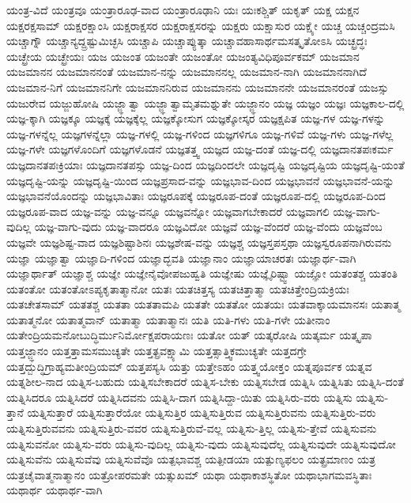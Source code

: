 {ಯಂತ್ರ-ವಿದೆ
ಯಂತ್ರವೂ
ಯಂತ್ರಾರೂಢ-ವಾದ
ಯಂತ್ರಾರೂಢಾನಿ
ಯಃ
ಯಃಕಶ್ಚಿತ್
ಯಕೃತ್
ಯಕ್ಷ
ಯಕ್ಷನ
ಯಕ್ಷರಕ್ಷಸಾಮ್
ಯಕ್ಷರಕ್ಷಾಂಸಿ
ಯಕ್ಷರಾಕ್ಷಸರ
ಯಕ್ಷರಾಕ್ಷಸರನ್ನು
ಯಕ್ಷರು
ಯಕ್ಷಾಸುರ
ಯಕ್ಷ್ಯೇ
ಯಚ್ಚ
ಯಚ್ಚಂದ್ರಮಸಿ
ಯಚ್ಚಾಗ್ನೌ
ಯಚ್ಚಾನ್ಯದ್ದ್ರಷ್ಟುಮಿಚ್ಛಸಿ
ಯಚ್ಚಾಪಿ
ಯಚ್ಚಾಪ್ಯುತ್ಕಾ
ಯಚ್ಚಾವಹಾಸಾರ್ಥಮಸತ್ಕೃತೋಽಸಿ
ಯಚ್ಛ್ರದ್ಧಃ
ಯಚ್ಛ್ರೇಯ
ಯಚ್ಛ್ರೇಯಃ
ಯಜ
ಯಜಂತ
ಯಜಂತೇ
ಯಜಂತೋ
ಯಜಂತ್ಯವಿಧಿಪೂರ್ವಕಮ್
ಯಜಮಾನ
ಯಜಮಾನನ
ಯಜಮಾನನಂತೆ
ಯಜಮಾನ-ನನ್ನು
ಯಜಮಾನನಲ್ಲ
ಯಜಮಾನ-ನಾಗಿ
ಯಜಮಾನನಾಗಿದೆ
ಯಜಮಾನ-ನಿಗೆ
ಯಜಮಾನನಿಗೇ
ಯಜಮಾನನಿರುವ
ಯಜಮಾನನು
ಯಜಮಾನನೇ
ಯಜಮಾನರಂತೆ
ಯಜಸ್ಸು
ಯಜುರೇವ
ಯಜ್ಜುಹೋಷಿ
ಯಜ್ಜ್ಞಾತ್ವಾ
ಯಜ್ಜ್ಞಾತ್ವಾಮೃತಮಶ್ನುತೇ
ಯಜ್ಜ್ಞಾನಂ
ಯಜ್ಞ
ಯಜ್ಞಂ
ಯಜ್ಞಃ
ಯಜ್ಞಕಾಲ-ದಲ್ಲಿ
ಯಜ್ಞ-ಕ್ಕಾಗಿ
ಯಜ್ಞಕ್ಕೂ
ಯಜ್ಞಕ್ಕೆ
ಯಜ್ಞಕ್ಕೆಲ್ಲ
ಯಜ್ಞಕ್ಕೋಸುಗ
ಯಜ್ಞಕ್ಕೋಸ್ಕರ
ಯಜ್ಞಕ್ಷಪಿತ
ಯಜ್ಞ-ಗಳ
ಯಜ್ಞ-ಗಳನ್ನು
ಯಜ್ಞ-ಗಳನ್ನೆಲ್ಲ
ಯಜ್ಞಗಳನ್ನೆಲ್ಲಾ
ಯಜ್ಞ-ಗಳಲ್ಲಿ
ಯಜ್ಞ-ಗಳಿಂದ
ಯಜ್ಞಗಳಿಗೂ
ಯಜ್ಞ-ಗಳಿವೆ
ಯಜ್ಞ-ಗಳು
ಯಜ್ಞ-ಗಳೆಲ್ಲ
ಯಜ್ಞ-ಗಳೇ
ಯಜ್ಞಗಳೊಂದಿಗೆ
ಯಜ್ಞಗಳೊಡನೆ
ಯಜ್ಞತತ್ತ್ವ
ಯಜ್ಞದ
ಯಜ್ಞ-ದಂತೆ
ಯಜ್ಞ-ದಲ್ಲಿ
ಯಜ್ಞದಾನತಪಃಕರ್ಮ
ಯಜ್ಞದಾನತಪಃಕ್ರಿಯಾಃ
ಯಜ್ಞದಾನತಪಸ್ಸು
ಯಜ್ಞ-ದಿಂದ
ಯಜ್ಞದಿಂದಲೇ
ಯಜ್ಞದೃಷ್ಟಿ
ಯಜ್ಞದೃಷ್ಟಿಯ
ಯಜ್ಞದೃಷ್ಟಿ-ಯಂತೆ
ಯಜ್ಞದೃಷ್ಟಿ-ಯನ್ನು
ಯಜ್ಞದೃಷ್ಟಿ-ಯಿಂದ
ಯಜ್ಞಪ್ರಸಾದ-ವನ್ನು
ಯಜ್ಞಭಾವ-ದಿಂದ
ಯಜ್ಞಭಾವನೆ
ಯಜ್ಞಭಾವನೆ-ಯನ್ನು
ಯಜ್ಞಭಾವನೆಯೊಂದನ್ನು
ಯಜ್ಞಭಾವಿತಾಃ
ಯಜ್ಞರೂಪಕ್ಕೆ
ಯಜ್ಞರೂಪ-ದಂತೆ
ಯಜ್ಞರೂಪ-ದಲ್ಲಿ
ಯಜ್ಞರೂಪ-ದಿಂದ
ಯಜ್ಞರೂಪ-ವಾದ
ಯಜ್ಞ-ವನ್ನು
ಯಜ್ಞ-ವನ್ನೂ
ಯಜ್ಞವನ್ನೋ
ಯಜ್ಞವಾಗಬೇಕಾದರೆ
ಯಜ್ಞವಾಗಲಿ
ಯಜ್ಞ-ವಾಗು-ವುದಿಲ್ಲ
ಯಜ್ಞ-ವಾಗು-ವುದು
ಯಜ್ಞ-ವಾದರೂ
ಯಜ್ಞವಿದೋ
ಯಜ್ಞವೆ
ಯಜ್ಞ-ವೆಂದರೆ
ಯಜ್ಞ-ವೆಂದು
ಯಜ್ಞವೆಂಬ
ಯಜ್ಞವೇ
ಯಜ್ಞಶಿಷ್ಟ-ವಾದ
ಯಜ್ಞಶಿಷ್ಟಾಶಿನಃ
ಯಜ್ಞಶೇಷ-ವನ್ನು
ಯಜ್ಞಶ್ಚ
ಯಜ್ಞಸ್ತಪಸ್ತಥಾ
ಯಜ್ಞಸ್ವರೂಪನಾಗಿರುವನು
ಯಜ್ಞಾ
ಯಜ್ಞಾತ್ವಾ
ಯಜ್ಞಾದಿ-ಗಳಿಂದ
ಯಜ್ಞಾದ್ಭವತಿ
ಯಜ್ಞಾನಾಂ
ಯಜ್ಞಾಯಾಚರತಃ
ಯಜ್ಞಾರ್ಥ-ವಾಗಿ
ಯಜ್ಞಾರ್ಥಾತ್
ಯಜ್ಞಾಶ್ಚ
ಯಜ್ಞೇ
ಯಜ್ಞೇನೈವೋಪಜುಹ್ವತಿ
ಯಜ್ಞೇಷು
ಯಜ್ಞೈರಿಷ್ಟ್ವಾ
ಯಜ್ಞೋ
ಯತಂತಶ್ಚ
ಯತಂತಿ
ಯತಂತೋ
ಯತಂತೋಽಪ್ಯಕೃತಾತ್ಮಾನೋ
ಯತಃ
ಯತಚಿತ್ತಸ್ಯ
ಯತಚಿತ್ತಾತ್ಮಾ
ಯತಚಿತ್ತೇಂದ್ರಿಯಕ್ರಿಯಃ
ಯತಚೇತಸಾಮ್
ಯತತಶ್ಚ
ಯತತಾ
ಯತತಾಮಪಿ
ಯತತೇ
ಯತತೋ
ಯತಯಃ
ಯತವಾಕ್ಕಾಯಮಾನಸಃ
ಯತಾತ್ಮ
ಯತಾತ್ಮನೋ
ಯತಾತ್ಮವಾನ್
ಯತಾತ್ಮಾ
ಯತಾತ್ಮಾನಃ
ಯತಿ
ಯತಿ-ಗಳು
ಯತಿ-ಗಳೇ
ಯತೀನಾಂ
ಯತೇಂದ್ರಿಯಮನೋಬುದ್ಧಿರ್ಮುನಿರ್ಮೋಕ್ಷಪರಾಯಣಃ
ಯತೋ
ಯತ್
ಯತ್ಕರೋಷಿ
ಯತ್ಕರ್ಮ
ಯತ್ಕೃಪಾ
ಯತ್ತಜ್ಜ್ಞಾನಂ
ಯತ್ತತ್ತಾಮಸಮುಚ್ಯತೇ
ಯತ್ತತ್ಪ್ರವಕ್ಷ್ಯಾಮಿ
ಯತ್ತತ್ಸಾತ್ತ್ವಿಕಮುಚ್ಯತೇ
ಯತ್ತದಗ್ರೇ
ಯತ್ತದ್ಬುದ್ಧಿಗ್ರಾಹ್ಯಮತೀಂದ್ರಿಯಮ್
ಯತ್ತಪಸ್ಯಸಿ
ಯತ್ತು
ಯತ್ತೇಽಹಂ
ಯತ್ತ್ವಯೋಕ್ತಂ
ಯತ್ನಪೂರ್ವಕ
ಯತ್ನವ
ಯತ್ನಶೀಲ-ನಾದ
ಯತ್ನಿಸ-ಬಹುದು
ಯತ್ನಿಸಬೇಕಾದರೆ
ಯತ್ನಿಸ-ಬೇಕು
ಯತ್ನಿಸಬೇಡ
ಯತ್ನಿಸಿ
ಯತ್ನಿಸಿತು
ಯತ್ನಿಸಿ-ದಂತೆ
ಯತ್ನಿಸಿದರೂ
ಯತ್ನಿಸಿದರೆ
ಯತ್ನಿಸಿದವನು
ಯತ್ನಿಸಿ-ದಾಗ
ಯತ್ನಿಸಿದ್ದಾ-ಯಿತು
ಯತ್ನಿಸಿರು-ವರು
ಯತ್ನಿಸು
ಯತ್ನಿಸು-ತ್ತಾನೆ
ಯತ್ನಿಸುತ್ತಾರೆ
ಯತ್ನಿಸುತ್ತಾರೆಯೋ
ಯತ್ನಿಸುತ್ತಿರ
ಯತ್ನಿಸುತ್ತಿರುವ
ಯತ್ನಿಸುತ್ತಿರುವನು
ಯತ್ನಿಸುತ್ತಿರು-ವರು
ಯತ್ನಿಸುತ್ತಿರುವವನು
ಯತ್ನಿಸುತ್ತಿರು-ವವರ
ಯತ್ನಿಸುತ್ತಿರುವೆ-ವಲ್ಲ
ಯತ್ನಿಸು-ತ್ತಿಲ್ಲ
ಯತ್ನಿಸು-ತ್ತೇವೆ
ಯತ್ನಿಸುವನು
ಯತ್ನಿಸುವನೋ
ಯತ್ನಿಸು-ವರು
ಯತ್ನಿಸು-ವುದಿಲ್ಲ
ಯತ್ನಿಸು-ವುದು
ಯತ್ನಿಸುವುದೆಲ್ಲ
ಯತ್ನಿಸುವುದೇ
ಯತ್ನಿಸುವುದೋ
ಯತ್ನಿಸುವೆನು
ಯತ್ನಿಸುವೆವು
ಯತ್ನಿಸುವೆವೊ
ಯತ್ಪಭಾವಶ್ಚ
ಯತ್ಪೀಡಯಾ
ಯತ್ಪುಣ್ಯಫಲಂ
ಯತ್ಪ್ರಮಾಣಂ
ಯತ್ರ
ಯತ್ರಚೈವಾತ್ಮನಾತ್ಮಾನಂ
ಯತ್ರೋಪರಮತೇ
ಯತ್ಸುಖಮ್
ಯಥಾ
ಯಥಾಕಾಶಸ್ಥಿತೋ
ಯಥಾಭಾಗಮವಸ್ಥಿತಾಃ
ಯಥಾರ್ಥ
ಯಥಾರ್ಥ-ವಾಗಿ
}
